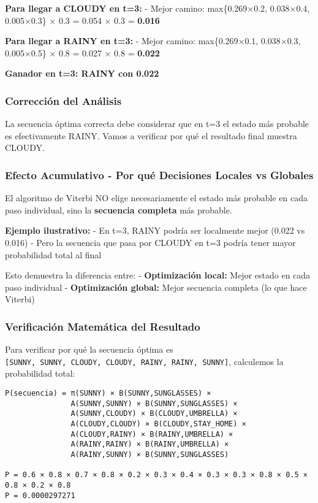 \documentclass[
]{article}
\begin{document}
\textbf{Para llegar a CLOUDY en t=3:} - Mejor camino: max\{0.269×0.2,
0.038×0.4, 0.005×0.3\} × 0.3 = 0.054 × 0.3 = \textbf{0.016}

\textbf{Para llegar a RAINY en t=3:} - Mejor camino: max\{0.269×0.1,
0.038×0.3, 0.005×0.5\} × 0.8 = 0.027 × 0.8 = \textbf{0.022}

\textbf{Ganador en t=3: RAINY con 0.022}

\subsubsection{Corrección del
Análisis}\label{correcciuxf3n-del-anuxe1lisis}

La secuencia óptima correcta debe considerar que en t=3 el estado más
probable es efectivamente RAINY. Vamos a verificar por qué el resultado
final muestra CLOUDY.

\subsubsection{Efecto Acumulativo - Por qué Decisiones Locales vs
Globales}\label{efecto-acumulativo---por-quuxe9-decisiones-locales-vs-globales}

El algoritmo de Viterbi NO elige necesariamente el estado más probable
en cada paso individual, sino la \textbf{secuencia completa} más
probable.

\textbf{Ejemplo ilustrativo:} - En t=3, RAINY podría ser localmente
mejor (0.022 vs 0.016) - Pero la secuencia que pasa por CLOUDY en t=3
podría tener mayor probabilidad total al final

Esto demuestra la diferencia entre: - \textbf{Optimización local:} Mejor
estado en cada paso individual - \textbf{Optimización global:} Mejor
secuencia completa (lo que hace Viterbi)

\subsubsection{Verificación Matemática del
Resultado}\label{verificaciuxf3n-matemuxe1tica-del-resultado}

Para verificar por qué la secuencia óptima es
\texttt{{[}SUNNY,\ SUNNY,\ CLOUDY,\ CLOUDY,\ RAINY,\ RAINY,\ SUNNY{]}},
calculemos la probabilidad total:

\begin{verbatim}
P(secuencia) = π(SUNNY) × B(SUNNY,SUNGLASSES) ×
               A(SUNNY,SUNNY) × B(SUNNY,SUNGLASSES) ×
               A(SUNNY,CLOUDY) × B(CLOUDY,UMBRELLA) ×
               A(CLOUDY,CLOUDY) × B(CLOUDY,STAY_HOME) ×
               A(CLOUDY,RAINY) × B(RAINY,UMBRELLA) ×
               A(RAINY,RAINY) × B(RAINY,UMBRELLA) ×
               A(RAINY,SUNNY) × B(SUNNY,SUNGLASSES)

P = 0.6 × 0.8 × 0.7 × 0.8 × 0.2 × 0.3 × 0.4 × 0.3 × 0.3 × 0.8 × 0.5 × 0.8 × 0.2 × 0.8
P = 0.0000297271
\end{verbatim}
\end{document}
